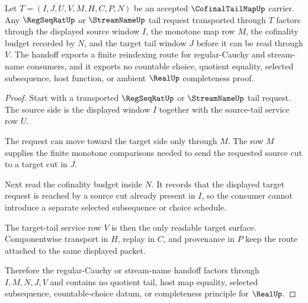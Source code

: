 \begin{theorem}
\label{thm:cofinal-tail-map-regular-cauchy-handoff}
Let $T=(I,J,U,V,M,H,C,P,N)$ be an accepted $\CofinalTailMapUp$ carrier. Any $\RegSeqRatUp$ or $\StreamNameUp$ tail request transported through $T$ factors through the displayed source window $I$, the monotone map row $M$, the cofinality budget recorded by $N$, and the target tail window $J$ before it can be read through $V$. The handoff exports a finite reindexing route for regular-Cauchy and stream-name consumers, and it exports no countable choice, quotient equality, selected subsequence, host function, or ambient $\RealUp$ completeness proof.
\end{theorem}

\begin{proof}
Start with a transported $\RegSeqRatUp$ or $\StreamNameUp$ tail request. The source side is the displayed window $I$ together with the source-tail service row $U$.

The request can move toward the target side only through $M$. The row $M$ supplies the finite monotone comparisons needed to send the requested source cut to a target cut in $J$.

Next read the cofinality budget inside $N$. It records that the displayed target request is reached by a source cut already present in $I$, so the consumer cannot introduce a separate selected subsequence or choice schedule.

The target-tail service row $V$ is then the only readable target surface. Componentwise transport in $H$, replay in $C$, and provenance in $P$ keep the route attached to the same displayed packet.

Therefore the regular-Cauchy or stream-name handoff factors through $I,M,N,J,V$ and contains no quotient tail, host map equality, selected subsequence, countable-choice datum, or completeness principle for $\RealUp$.
\end{proof}


